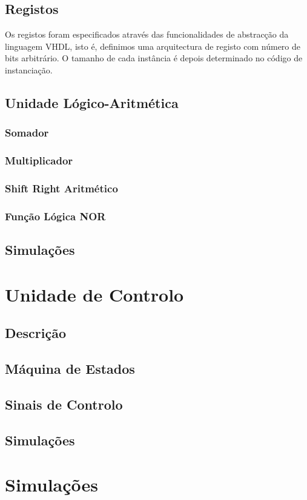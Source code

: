 \documentclass[a4paper]{article}
\begin{document}
\subsection{Registos}
\indent Os registos foram especificados através das funcionalidades de abstracção da linguagem VHDL, isto é, definimos uma arquitectura de registo com número de bits arbitrário. O tamanho de cada instância é depois determinado no código de instanciação.\\
\subsection{Unidade Lógico-Aritmética}
\subsubsection{Somador}
\subsubsection{Multiplicador}
\subsubsection{Shift Right Aritmético}
\subsubsection{Função Lógica NOR}
\pagebreak
\subsection{Simulações}
\pagebreak


\section{Unidade de Controlo}
\subsection{Descrição}
\subsection{Máquina de Estados}
\subsection{Sinais de Controlo}
\pagebreak
\subsection{Simulações}
\pagebreak


\section{Simulações}
\end{document}
